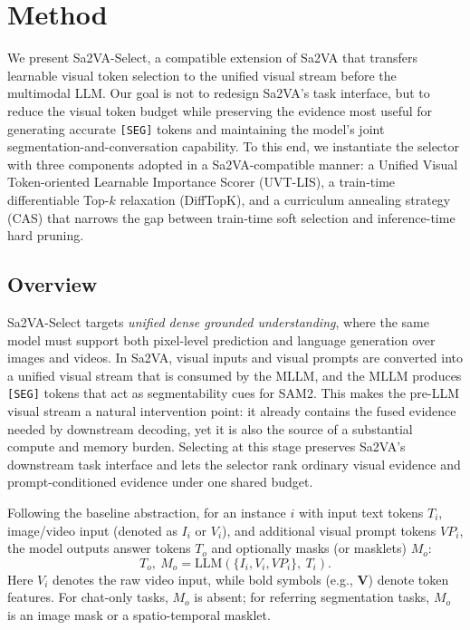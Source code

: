 \section{Method}
\label{sec:method}

We present Sa2VA-Select, a compatible extension of Sa2VA that transfers learnable visual token selection to the unified visual stream before the multimodal LLM.
Our goal is not to redesign Sa2VA's task interface, but to reduce the visual token budget while preserving the evidence most useful for generating accurate \texttt{[SEG]} tokens and maintaining the model's joint segmentation-and-conversation capability.
To this end, we instantiate the selector with three components adopted in a Sa2VA-compatible manner: a Unified Visual Token-oriented Learnable Importance Scorer (UVT-LIS), a train-time differentiable Top-$k$ relaxation (DiffTopK), and a curriculum annealing strategy (CAS) that narrows the gap between train-time soft selection and inference-time hard pruning.

\subsection{Overview}
\label{sec:method_overview}
Sa2VA-Select targets \emph{unified dense grounded understanding}, where the same model must support both pixel-level prediction and language generation over images and videos.
In Sa2VA, visual inputs and visual prompts are converted into a unified visual stream that is consumed by the MLLM, and the MLLM produces \texttt{[SEG]} tokens that act as segmentability cues for SAM2.
This makes the pre-LLM visual stream a natural intervention point: it already contains the fused evidence needed by downstream decoding, yet it is also the source of a substantial compute and memory burden.
Selecting at this stage preserves Sa2VA's downstream task interface and lets the selector rank ordinary visual evidence and prompt-conditioned evidence under one shared budget.

Following the baseline abstraction, for an instance $i$ with input text tokens $T_i$, image/video input (denoted as $I_i$ or $V_i$), and additional visual prompt tokens $VP_i$, the model outputs answer tokens $T_o$ and optionally masks (or masklets) $M_o$:
\begin{equation}
T_o,\ M_o = \mathrm{LLM}(\{I_i, V_i, VP_i\},\ T_i).
\label{eq:sa2va_unified_task}
\end{equation}
Here $V_i$ denotes the raw video input, while bold symbols (e.g., $\mathbf{V}$) denote token features.
For chat-only tasks, $M_o$ is absent; for referring segmentation tasks, $M_o$ is an image mask or a spatio-temporal masklet.

